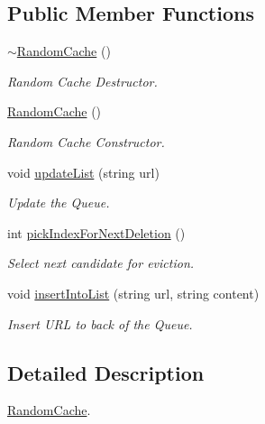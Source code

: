 \subsection*{\-Public \-Member \-Functions}
\begin{DoxyCompactItemize}
\item 
\hypertarget{classRandomCache_ac8fc4e9935427c8e05ae6bb01322654d}{\hyperlink{classRandomCache_ac8fc4e9935427c8e05ae6bb01322654d}{$\sim$\-Random\-Cache} ()}\label{classRandomCache_ac8fc4e9935427c8e05ae6bb01322654d}

\begin{DoxyCompactList}\small\item\em \-Random \-Cache \-Destructor. \end{DoxyCompactList}\item 
\hypertarget{classRandomCache_a1e619bf1789ec07f0ab622f559dbb52a}{\hyperlink{classRandomCache_a1e619bf1789ec07f0ab622f559dbb52a}{\-Random\-Cache} ()}\label{classRandomCache_a1e619bf1789ec07f0ab622f559dbb52a}

\begin{DoxyCompactList}\small\item\em \-Random \-Cache \-Constructor. \end{DoxyCompactList}\item 
void \hyperlink{classRandomCache_a3aae77b7542e80418669d138223cfcc0}{update\-List} (string url)
\begin{DoxyCompactList}\small\item\em \-Update the \-Queue. \end{DoxyCompactList}\item 
int \hyperlink{classRandomCache_ad9362f5b0a972495d03beca2c770d10b}{pick\-Index\-For\-Next\-Deletion} ()
\begin{DoxyCompactList}\small\item\em \-Select next candidate for eviction. \end{DoxyCompactList}\item 
void \hyperlink{classRandomCache_aac3ac982daf70108b6b179bb0cdb787d}{insert\-Into\-List} (string url, string content)
\begin{DoxyCompactList}\small\item\em \-Insert \-U\-R\-L to back of the \-Queue. \end{DoxyCompactList}\end{DoxyCompactItemize}


\subsection{\-Detailed \-Description}
\hyperlink{classRandomCache}{\-Random\-Cache}. 

